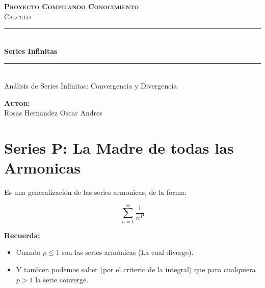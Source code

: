 \documentclass[12pt]{article}							    %
\author{Oscar Andrés Rosas}						            %
\begin{document}
\begin{titlepage}

	\center
	\textbf{\textsc{\Large Proyecto Compilando Conocimiento}}\\[1.0cm] 
	\textsc{\Large Calculo}\\[1.0cm] 

	\rule{\linewidth}{0.5mm} \\[1.0cm]
		{ \huge \bfseries Series Infinitas}\\[1.0cm] 
	\rule{\linewidth}{0.5mm} \\[2.0cm]
	
	{\LARGE Análisis de Series Infinitas: Convergencia y Divergencia}\\[7cm] 
	
	\begin{center} \large
	\textbf{\textsc{Autor:}}\\
	Rosas Hernandez Oscar Andres
	\end{center}

	\vfill

\end{titlepage}





\section{Series P: La Madre de todas las Armonicas}
Es una generalización de las series armonicas, de la forma:

\begin{equation}
    \sum_{n=1}^{\infty} \frac{1}{n^P}
\end{equation}

\textbf{Recuerda:}
\begin{itemize}
    \item Cuando $p\leq1$ son las series armónicas (La cual diverge).
    \item Y tambien podemos saber (por el criterio de la integral) que para cualquiera $p>1$ la serie converge.
\end{itemize}
\end{document}
